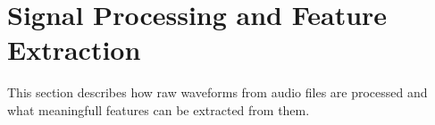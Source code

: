 
\section{Signal Processing and Feature Extraction}\label{sec:features}
This section describes how raw waveforms from audio files are processed and what meaningfull features can be extracted from them.